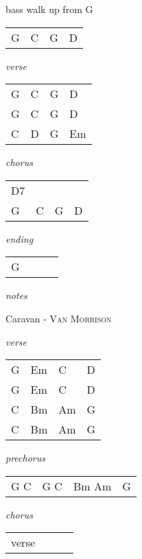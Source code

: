 \documentclass[12pt]{article}
\begin{document}
bass walk up from G

\begin{tabular}{|P{1.25in}|P{1.25in}|P{1.25in}|P{1.25in}|}
  G &  C  &  G  &  D \\
\end{tabular}

\textit{verse}

\begin{tabular}{|P{1.25in}|P{1.25in}|P{1.25in}|P{1.25in}|}
  G &  C  &  G  &  D \\
  G &  C  &  G  &  D \\
  C &  D  &  G  &  Em \\
\end{tabular}

\textit{chorus}

\begin{tabular}{|P{1.25in}|P{1.25in}|P{1.25in}|P{1.25in}|}
  D7 &     &     &   \\
  G  &  C  &  G  &  D \\
\end{tabular}

\textit{ending}

\begin{tabular}{|P{1.25in}|P{1.25in}|P{1.25in}|P{1.25in}|}
  G  &   &   &   \\
\end{tabular}

\textit{notes}

\newpage

{\Huge Caravan} {\huge - \textsc{Van Morrison}}

\huge
\textit{verse}

\begin{tabular}{|P{1.25in}|P{1.25in}|P{1.25in}|P{1.25in}|}
  G  & Em  & C  &  D \\
  G  & Em  & C  &  D \\
  C  & Bm  & Am  &  G \\
  C  & Bm  & Am  &  G \\
\end{tabular}

\textit{prechorus}

\begin{tabular}{|P{1.25in}|P{1.25in}|P{1.25in}|P{1.25in}|}
  G C  &  G C & Bm Am  &  G \\
\end{tabular}

\textit{chorus}

\begin{tabular}{|P{1.25in}|P{1.25in}|P{1.25in}|P{1.25in}|}
  verse
\end{tabular}
\end{document}
